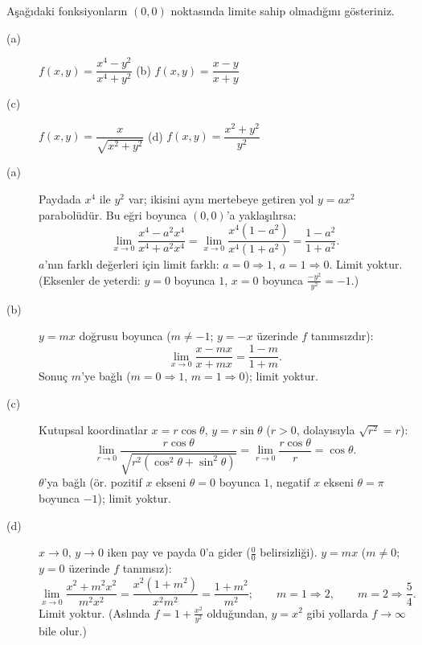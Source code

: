 \begin{soru}
Aşağıdaki fonksiyonların $(0,0)$ noktasında limite sahip olmadığını gösteriniz.
\begin{description}
  \item[(a)] $f(x,y)=\dfrac{x^4-y^2}{x^4+y^2}$ \qquad (b) $f(x,y)=\dfrac{x-y}{x+y}$
  \item[(c)] $f(x,y)=\dfrac{x}{\sqrt{x^2+y^2}}$ \qquad (d) $f(x,y)=\dfrac{x^2+y^2}{y^2}$
\end{description}
\end{soru}
\begin{cevap}
\begin{description}
  \item[(a)] Paydada $x^4$ ile $y^2$ var; ikisini aynı mertebeye getiren yol $y=ax^2$ parabolüdür. Bu eğri boyunca
  $(0,0)$'a yaklaşılırsa:
  \[
  \lim_{x\to0}\frac{x^4-a^2x^4}{x^4+a^2x^4}=\lim_{x\to0}\frac{x^4(1-a^2)}{x^4(1+a^2)}=\frac{1-a^2}{1+a^2}.
  \]
  $a$'nın farklı değerleri için limit farklı: $a=0\Rightarrow1$, $a=1\Rightarrow0$. Limit yoktur. (Eksenler de yeterdi:
  $y=0$ boyunca $1$, $x=0$ boyunca $\frac{-y^2}{y^2}=-1$.)
  \item[(b)] $y=mx$ doğrusu boyunca ($m\neq-1$; $y=-x$ üzerinde $f$ tanımsızdır):
  \[
  \lim_{x\to0}\frac{x-mx}{x+mx}=\frac{1-m}{1+m}.
  \]
  Sonuç $m$'ye bağlı ($m=0\Rightarrow1$, $m=1\Rightarrow0$); limit yoktur.
  \item[(c)] Kutupsal koordinatlar $x=r\cos\theta$, $y=r\sin\theta$ ($r>0$, dolayısıyla $\sqrt{r^2}=r$):
  \[
  \lim_{r\to0}\frac{r\cos\theta}{\sqrt{r^2(\cos^2\theta+\sin^2\theta)}}=\lim_{r\to0}\frac{r\cos\theta}{r}=\cos\theta .
  \]
  $\theta$'ya bağlı (ör. pozitif $x$ ekseni $\theta=0$ boyunca $1$, negatif $x$ ekseni $\theta=\pi$ boyunca $-1$);
  limit yoktur.
  \item[(d)] $x\to0$, $y\to0$ iken pay ve payda $0$'a gider ($\frac00$ belirsizliği). $y=mx$ ($m\neq0$; $y=0$ üzerinde
  $f$ tanımsız):
  \[
  \lim_{x\to0}\frac{x^2+m^2x^2}{m^2x^2}=\frac{x^2(1+m^2)}{x^2m^2}=\frac{1+m^2}{m^2};\qquad
  m=1\Rightarrow 2,\qquad m=2\Rightarrow\frac54 .
  \]
  Limit yoktur. (Aslında $f=1+\frac{x^2}{y^2}$ olduğundan, $y=x^2$ gibi yollarda $f\to\infty$ bile olur.)
\end{description}
\end{cevap}

